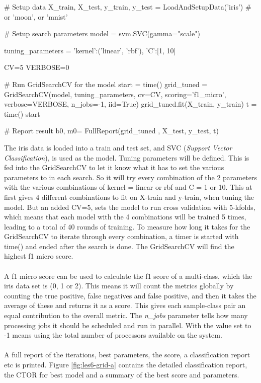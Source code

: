\documentclass{article}
\begin{document}
\begin{pyminted}
# Setup data
X_train, X_test, y_train, y_test = LoadAndSetupData('iris') # or 'moon', or 'mnist'

# Setup search parameters
model = svm.SVC(gamma="scale")

tuning_parameters = {
    'kernel':('linear', 'rbf'), 
    'C':[1, 10]
}

CV=5
VERBOSE=0

# Run GridSearchCV for the model
start = time()
grid_tuned = GridSearchCV(model, tuning_parameters, cv=CV, scoring='f1_micro', verbose=VERBOSE, n_jobs=-1, iid=True)
grid_tuned.fit(X_train, y_train)
t = time()-start

# Report result
b0, m0= FullReport(grid_tuned , X_test, y_test, t)
\end{pyminted}

The iris data is loaded into a train and test set, and SVC (\textit{Support Vector Classification}), is used as the model. Tuning parameters will be defined. This is fed into the GridSearchCV to let it know what it has to set the various parameters to in each search. So it will try every combination of the 2 parameters with the various combinations of kernel = linear or rbf and C = 1 or 10. This at first gives 4 different combinations to fit on X-train and y-train, when tuning the model. But an added CV=5, sets the model to run cross validation with 5-kfolds, which means that each model with the 4 combinations will be trained 5 times, leading to a total of 40 rounds of training. To measure how long it takes for the GridSearchCV to iterate through every combination, a timer is started with time() and ended after the search is done.  The GridSearchCV will find the highest f1 micro score. 
\\ \\
A f1 micro score can be used to calculate the f1 score of a multi-class, which the iris data set is (0, 1 or 2). This means it will count the metrics globally by counting the true positive, false negatives and false positive, and then it takes the average of these and returns it as a score. This gives each sample-class pair an equal contribution to the overall metric. The \textit{n\_jobs} parameter tells how many processing jobs it should be scheduled and run in parallel. With the value set to -1 means using the total number of processors available on the system.
\\ \\
A full report of the iterations, best parameters, the score, a classification report etc is printed. Figure \ref{fig:les6-grid-a}
contains the detailed classification report, the CTOR for best model and a summary of the best score and parameters.
\end{document}
